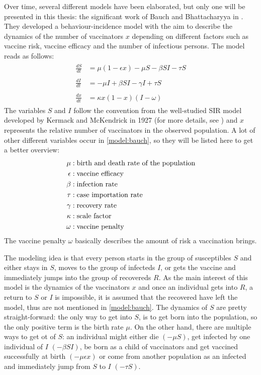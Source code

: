 \documentclass[12pt,a4paper,twoside]{article}
\begin{document}
Over time, several different models have been elaborated, but only one will be presented in this thesis: the significant work of Bauch and Bhattacharyya in \cite{Bauch2012}. They developed a behaviour-incidence model with the aim to describe the dynamics of the number of vaccinators $x$ depending on different factors such as vaccine risk, vaccine efficacy and the number of infectious persons. The model reads as follows:
\begin{align}\label{model:bauch}
	\begin{split}
	\frac{dS}{dt} &= \mu\left(1-\epsilon x\right) - \mu S - \beta SI - \tau S\\
	&\\
	\frac{dI}{dt} &= -\mu I + \beta SI - \gamma I + \tau S\\
	&\\
	\frac{dx}{dt} &= \kappa x\left(1 - x\right)\left(I - \omega\right)
	\end{split}
\end{align}
The variables $S$ and $I$ follow the convention from the well-studied \ac{SIR} model developed by Kermack and McKendrick in 1927 (for more details, see \cite{Muller2015}) and $x$ represents the relative number of vaccinators in the observed population. A lot of other different variables occur in \eqref{model:bauch}, so they will be listed here to get a better overview:
\begin{align}\label{table:bauch_model_variables}
	\begin{split}
	\mu &: \textnormal{birth and death rate of the population}\\
	\epsilon &: \textnormal{vaccine efficacy}\\
	\beta &: \textnormal{infection rate}\\
	\tau &: \textnormal{case importation rate}\\
	\gamma &: \textnormal{recovery rate}\\
	\kappa &: \textnormal{scale factor}\\
	\omega &: \textnormal{vaccine penalty}
	\end{split}
\end{align}
The vaccine penalty $\omega$ basically describes the amount of risk a vaccination brings.

The modeling idea is that every person starts in the group of susceptibles $S$ and either stays in $S$, moves to the group of infecteds $I$, or gets the vaccine and immediately jumps into the group of recovereds $R$. As the main interest of this model is the dynamics of the vaccinators $x$ and once an individual gets into $R$, a return to $S$ or $I$ is impossible, it is assumed that the recovered have left the model, thus are not mentioned in \eqref{model:bauch}. The dynamics of $S$ are pretty straight-forward: the only way to get into $S$, is to get born into the population, so the only positive term is the birth rate $\mu$. On the other hand, there are multiple ways to get ot of $S$: an individual might either die $\left(-\mu S\right)$, get infected by one individual of $I$ $\left(-\beta SI\right)$, be born as a child of vaccinators and get vaccined successfully at birth $\left(-\mu\epsilon x\right)$ or come from another population as an infected and immediately jump from $S$ to $I$ $\left(-\tau S\right)$. 
\end{document}
